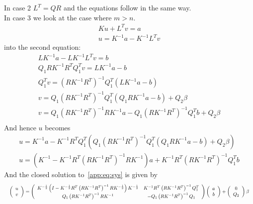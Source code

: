 %
In case 2 $L^T=QR$ and the equations follow in the same way.
\\[1em]
In case 3 we look at the case where $m>n$.
%
\begin{equation}\begin{split}
	K u + L^T v = a\\
	u = K^{-1} a - K^{-1}L^T v
\end{split}\end{equation}
%
into the second equation:
%
\begin{equation}\begin{split}
	L K^{-1} a - L K^{-1} L^T v = b\\
	Q_1 R K^{-1} R^T Q_1^T v = L K^{-1} a - b \\
	Q_1^T v = \left(RK^{-1}R^T\right)^{-1} Q_1^T\left(L K^{-1} a - b \right)\\
	v = Q_1 \left(RK^{-1}R^T\right)^{-1} Q_1^T\left(Q_1 R K^{-1} a - b \right) + Q_2 \beta \\
	v = Q_1 \left(RK^{-1}R^T\right)^{-1} R K^{-1} a - Q_1 \left(RK^{-1}R^T\right)^{-1} Q_1^T b + Q_2 \beta \\
\end{split}\end{equation}
%
And hence $u$ becomes
%
\begin{equation}\begin{split}
	u = K^{-1} a - K^{-1} R^T Q_1^T \left(Q_1 \left(RK^{-1}R^T\right)^{-1} Q_1^T\left(Q_1 
	R K^{-1} a - b \right) + Q_2 \beta \right) \\
	u = \left(K^{-1} - K^{-1} R^T \left(RK^{-1}R^T\right)^{-1} R K^{-1} \right) a + 
	K^{-1} R^T \left(RK^{-1}R^T\right)^{-1} Q_1^T b
\end{split}\end{equation}
%
And the closed solution to~\eqref{app:eq:sys} is given by
%
\begin{equation}\Resize{
	\left(\begin{array}{c}
	u \\ v
	\end{array}\right) = \left(\begin{array}{cc}
	K^{-\frac{1}{2}}\left(I - K^{-\frac{1}{2}} R^T \left(RK^{-1}R^T\right)^{-1} RK^{-\frac{1}{2}} \right) K^{-\frac{1}{2}} &
	K^{-1} R^T \left(RK^{-1}R^T\right)^{-1} Q_1^T \\
	Q_1 \left(RK^{-1}R^T\right)^{-1} R K^{-1} &
	-Q_1 \left(RK^{-1}R^T\right)^{-1} Q_1
	\end{array}\right)\left(\begin{array}{c}
	a \\ b
	\end{array}\right) + \left(\begin{array}{c}
	0 \\ Q_2 
	\end{array}\right) \beta}
\end{equation}